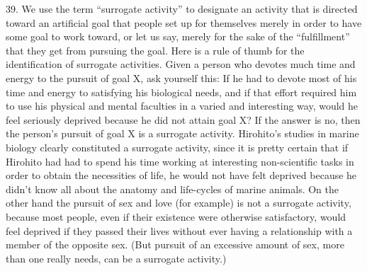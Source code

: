 \documentclass{article}
\begin{document}
39.  We use the term “surrogate activity” to designate an activity that is directed toward an artificial 
goal that people set up for themselves merely in order to have some goal to work toward, or let us 
say, merely for the sake of the “fulfillment” that they get from pursuing the goal.  Here is a rule of 
thumb for the identification of surrogate activities.  Given a person who devotes much time and 
energy to the pursuit of goal X, ask yourself this: If he had to devote most of his time and energy 
to  satisfying  his  biological  needs,  and  if  that  effort  required  him  to  use  his  physical  and  mental  
faculties in a varied and interesting way, would he feel seriously deprived because he did not attain 
goal X? If the answer is no, then the person’s pursuit of goal X is a surrogate activity.  Hirohito’s 
studies in marine biology clearly constituted a surrogate activity, since it is pretty certain that if 
Hirohito had had to spend his time working at interesting non-scientific tasks in order to obtain the 
necessities of life, he would not have felt deprived because he didn’t know all about the anatomy 
and life-cycles of marine animals.  On the other hand the pursuit of sex and love (for example) is 
not a surrogate activity, because most people, even if their existence were otherwise satisfactory, 
would feel deprived if they passed their lives without ever having a relationship with a member of 
the opposite sex.  (But pursuit of an excessive amount of sex, more than one really needs, can be 
a surrogate activity.) \vspace{\baselineskip}
\end{document}
